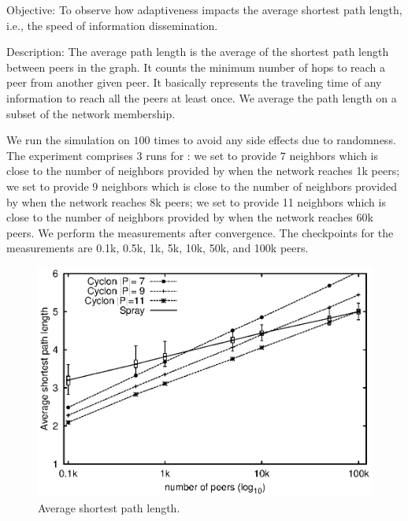 \begin{asparadesc}
\item[Objective:] To observe how adaptiveness impacts the average shortest path
  length, i.e., the speed of information dissemination.
\item[Description:] The average path length is the average of the shortest path
  length between peers in the graph. It counts the minimum number of hops to
  reach a peer from another given peer. It basically represents the traveling
  time of any information to reach all the peers at least once. We average the
  path length on a subset of the network membership.

  We run the simulation on \SPRAY $100$ times to avoid any side effects due to
  randomness. The experiment comprises 3 runs for \CYCLON: we set \CYCLON to
  provide $7$ neighbors which is close to the number of neighbors provided by
  \SPRAY when the network reaches 1k peers; we set \CYCLON to provide 9
  neighbors which is close to the number of neighbors provided by \SPRAY when
  the network reaches 8k peers; we set \CYCLON to provide 11 neighbors which is
  close to the number of neighbors provided by \SPRAY when the network reaches
  60k peers. We perform the measurements after convergence. The checkpoints for
  the measurements are 0.1k, 0.5k, 1k, 5k, 10k, 50k, and 100k peers.

\begin{figure}
  \centering
  \includegraphics[width=\SCALE\textwidth]{img/avgpath.eps}
  \caption{\label{fig:avgpath}Average shortest path length.}
\end{figure}


\end{asparadesc}
